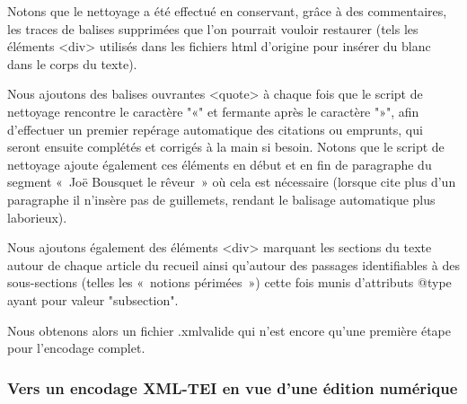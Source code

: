 Notons que le nettoyage a été effectué en conservant, grâce à des commentaires, les traces de balises supprimées que l'on pourrait vouloir restaurer (tels les éléments <div> utilisés dans les fichiers html d'origine pour insérer du blanc dans le corps du texte).

Nous ajoutons des balises ouvrantes <quote> à chaque fois que le script de nettoyage rencontre le caractère "«" et fermante après le caractère "»", afin d'effectuer un premier repérage automatique des citations ou emprunts, qui seront ensuite complétés et corrigés à la main si besoin. Notons que le script de nettoyage ajoute également ces éléments en début et en fin de paragraphe du segment «~Joë Bousquet le rêveur~» où cela est nécessaire (lorsque \robbe{} cite plus d'un paragraphe il n'insère pas de guillemets, rendant le balisage automatique plus laborieux).

Nous ajoutons également des éléments <div> marquant les sections du texte autour de chaque article du recueil ainsi qu'autour des passages identifiables à des sous-sections (telles les «~notions périmées~») cette fois munis d'attributs @type ayant pour valeur "subsection".

Nous obtenons alors un fichier \go.xml\gf valide qui n'est encore qu'une première étape pour l'encodage complet.

\subsubsection{Vers un encodage XML-TEI en vue d'une édition numérique}
\label{tei}

